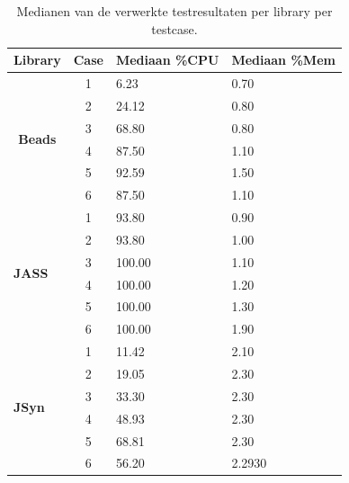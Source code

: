 \begin{table}[]
\centering
\begin{tabular}{l|c|l|l}
\textbf{Library} & \textbf{Case} & \textbf{Mediaan \%CPU} & \textbf{Mediaan \%Mem} \\ \hline
\multicolumn{1}{c}{\multirow{6}{*}{\textbf{Beads}}} & 1             & 6.23      & 0.70     \\
\multicolumn{1}{c}{}                                & 2             & 24.12      & 0.80    \\
\multicolumn{1}{c}{}                                & 3             & 68.80      & 0.80         \\
\multicolumn{1}{c}{}                                & 4             & 87.50     & 1.10           \\
\multicolumn{1}{c}{}                                & 5             & 92.59    & 1.50                  \\
\multicolumn{1}{c}{}                                & 6             & 87.50    & 1.10       \\ \hline
\multirow{6}{*}{\textbf{JASS}}                      & 1             & 93.80     & 0.90          \\
                                                    & 2             & 93.80   & 1.00                    \\
                                                    & 3             & 100.00        & 1.10    \\
                                                    & 4             & 100.00     & 1.20         \\
                                                    & 5             & 100.00                  & 1.30           \\
                                                    & 6             & 100.00      & 1.90           \\ \hline
\multirow{6}{*}{\textbf{JSyn}}                      & 1             & 11.42    & 2.10           \\
                                                    & 2             & 19.05   & 2.30   \\
                                                    & 3             & 33.30     & 2.30         \\
                                                    & 4             & 48.93    & 2.30          \\
                                                    & 5             & 68.81    & 2.30         \\
                                                    & 6             & 56.20    & 2.2930       \\ \hline
\end{tabular}
\caption{Medianen van de verwerkte testresultaten per library per testcase.}
\label{medians}
\end{table}

